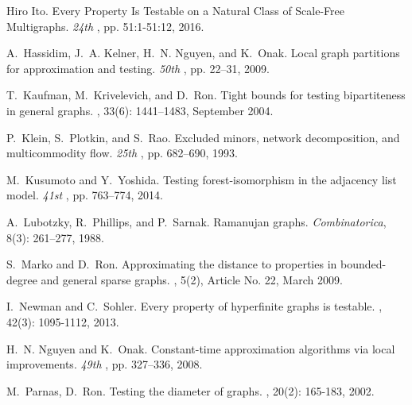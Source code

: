 \documentclass[11pt]{article}
\begin{document}
\begin{thebibliography}{1}
Hiro Ito.
\newblock Every Property Is Testable on a Natural Class of Scale-Free Multigraphs.
\newblock \emph{\Proc 24th \ESA}, pp. 51:1-51:12, 2016.

A.~Hassidim, J.~A. Kelner, H.~N. Nguyen, and K.~Onak.
\newblock Local graph partitions for approximation and testing.
\newblock \emph{\Proc 50th \FOCS}, pp. 22--31, 2009.

T.~Kaufman, M.~Krivelevich, and D.~Ron.
\newblock Tight bounds for testing bipartiteness in general graphs.
\newblock \emph{\SICOMP}, 33(6): 1441--1483, September 2004.

P.~Klein, S.~Plotkin, and S.~Rao.
\newblock Excluded minors, network decomposition, and multicommodity flow.
\newblock \emph{\Proc 25th \STOC}, pp. 682--690, 1993.

M.~Kusumoto and Y.~Yoshida.
\newblock Testing forest-isomorphism in the adjacency list model.
\newblock \emph{\Proc 41st \ICALP}, pp. 763--774, 2014.

A.~Lubotzky, R.~Phillips, and P.~Sarnak.
\newblock Ramanujan graphs.
\newblock \emph{Combinatorica}, 8(3): 261--277, 1988.

S.~Marko and D.~Ron.
\newblock Approximating the distance to properties in bounded-degree
  and general sparse graphs.
\newblock \emph{\TALG}, 5(2), Article No. 22, March 2009.

I.~Newman and C.~Sohler.
\newblock Every property of hyperfinite graphs is testable.
\newblock \emph{\SICOMP}, 42(3): 1095-1112, 2013.

H.~N. Nguyen and K.~Onak.
\newblock Constant-time approximation algorithms via local improvements.
\newblock \emph{\Proc 49th \FOCS}, pp. 327--336, 2008.

M.~Parnas, D.~Ron.
\newblock Testing the diameter of graphs.
\newblock \emph{\RSA}, 20(2): 165-183, 2002.

\end{thebibliography}
\end{document}
